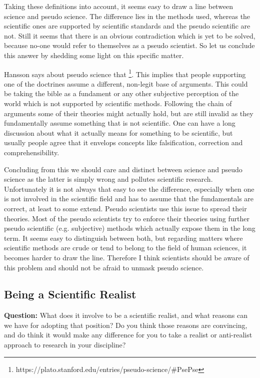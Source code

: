 \documentclass[11pt]{scrartcl}
\begin{document}
Taking these definitions into account, it seems easy to draw a line between science and pseudo science. The difference lies in the methods used, whereas the scientific ones are supported by scientific standards and the pseudo scientific are not. Still it seems that there is an obvious contradiction which is yet to be solved, because no-one would refer to themselves as a pseudo scientist. So let us conclude this answer by shedding some light on this specific matter.

Hansson says about pseudo science that  \footnote{https://plato.stanford.edu/entries/pseudo-science/\#PsePse}. This implies that people supporting one of the doctrines assume a different, non-legit base of arguments. This could be taking the bible as a fundament or any other subjective perception of the world which is not supported by scientific methods. Following the chain of arguments some of their theories might actually hold, but are still invalid as they fundamentally assume something that is not scientific. One can have a long discussion about what it actually means for something to be scientific, but usually people agree that it envelops concepts like falsification, correction and comprehensibility.

Concluding from this we should care and distinct between science and pseudo science as the latter is simply wrong and pollutes scientific research. Unfortunately it is not always that easy to see the difference, especially when one is not involved in the scientific field and has to assume that the fundamentals are correct, at least to some extend. Pseudo scientists use this issue to spread their theories. Most of the pseudo scientists try to enforce their theories using further pseudo scientific (e.g. subjective) methods which actually expose them in the long term. It seems easy to distinguish between both, but regarding matters where scientific methods are crude or tend to belong to the field of human sciences, it becomes harder to draw the line. Therefore I think scientists should be aware of this problem and should not be afraid to unmask pseudo science.

\subsection{Being a Scientific Realist}

\textbf{Question:} What does it involve to be a scientific realist, and what reasons can we have for adopting that position? Do you think those reasons are convincing, and do think it would make any difference for you to take a realist or anti-realist approach to research in your discipline?
\end{document}
